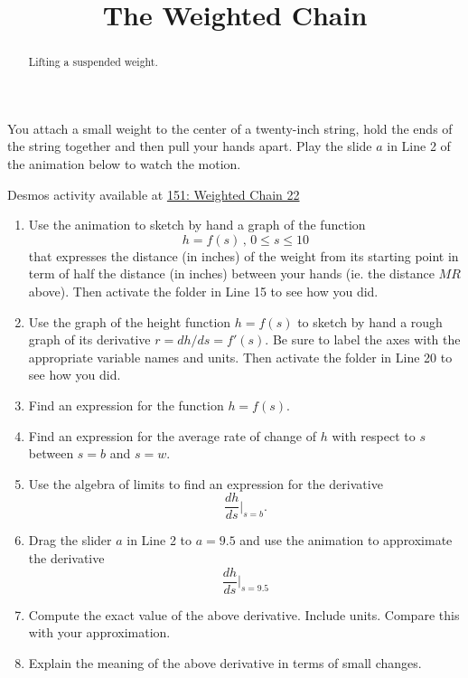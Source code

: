 \documentclass{ximera}
\title{The Weighted Chain}
\begin{document}
\begin{abstract}
Lifting a suspended weight.
\end{abstract}
\maketitle


\begin{question}  \label{Q:LMMN89}
You attach a small weight to the center of a twenty-inch string, hold the ends of the string together and then pull your hands apart. Play the slide $a$ in Line 2 of the animation below to watch the motion. 
\begin{onlineOnly}
    \begin{center}
\end{center}
\end{onlineOnly}

Desmos activity available at \href{https://www.desmos.com/calculator/jmqscra2if}{151: Weighted Chain 22} 

\begin{enumerate}
\item Use the animation to sketch by hand a graph of the function
\[
 h = f(s) \, , \, 0\leq s \leq 10
\]
that expresses the distance (in inches) of the weight from its starting point in term of half the distance (in inches) between your hands (ie. the distance $MR$ above). Then activate the folder in Line 15 to see how you did.

\item Use the graph of the height function $h=f(s)$ to sketch by hand a rough graph of its derivative $r = dh/ds = f'(s)$. Be sure to label the axes with the appropriate variable names and units. Then activate the folder in Line 20 to see how you did.

\item Find an expression for the function $h=f(s)$.

\item Find an expression for the average rate of change of $h$ with respect to $s$ between $s=b$ and $s=w$.

\item Use the algebra of limits to find an expression for the derivative
\[
   \frac{dh}{ds}\Big|_{s=b} .
\]

\item Drag the slider $a$ in Line 2 to $a=9.5$ and use the animation to approximate the derivative
\[
  \frac{dh}{ds}\Big|_{s=9.5}
\]

\item Compute the exact value of the above derivative. Include units. Compare this with your approximation.

\item Explain the meaning of the above derivative in terms of small changes.


\end{enumerate}


\end{question}
\end{document}
